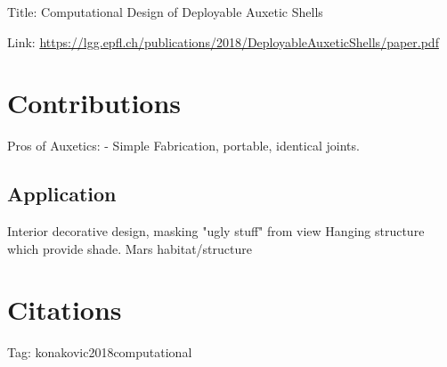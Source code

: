 \documentclass{article}
\begin{document}
    
Title: Computational Design of Deployable Auxetic Shells

Link: \url{https://lgg.epfl.ch/publications/2018/DeployableAuxeticShells/paper.pdf} 

\section*{Contributions}
Pros of Auxetics: 
- Simple Fabrication, portable, identical joints. 


\subsection*{Application}
Interior decorative design, masking "ugly stuff" from view
Hanging structure which provide shade. 
Mars habitat/structure





\section*{Citations}


Tag: konakovic2018computational
\cite{konakovic2018computational}
\end{document}
